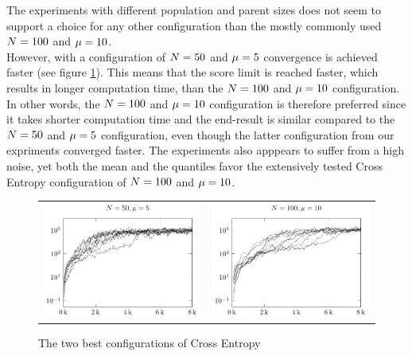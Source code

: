 The experiments with different population and parent sizes
does not seem to support a choice for any other configuration 
than the mostly commonly used 
$N = 100$ and $\mu = 10$. \\
However, with a configuration of $N = 50$ and $\mu = 5$ convergence
is achieved faster (see figure \ref{fig:bestConfCE}). This means that the score limit is reached faster, which
results in longer computation time, than the $N = 100$ and $\mu = 10$
configuration. In other words, the $N = 100$ and $\mu = 10$ configuration 
is therefore preferred since it takes shorter computation time and the end-result is similar compared
to the $N = 50$ and $\mu = 5$ configuration, even though the latter 
configuration from our expriments converged faster. The experiments also apppears
to suffer from a high noise, yet both the mean and the quantiles favor the 
extensively tested Cross Entropy configuration of $N = 100$ and $\mu = 10$.


\begin{figure}[H]
\begin{tabular}{@{}l@{}l@{}}
\includegraphics[scale=1]{plots/ce_ConstantNoise_l50_o5_all} &
\includegraphics[scale=1]{plots/ce_ConstantNoise_l100_o10_all}
\end{tabular}
\caption{The two best configurations of Cross Entropy 
\label{fig:bestConfCE}}
\end{figure}

